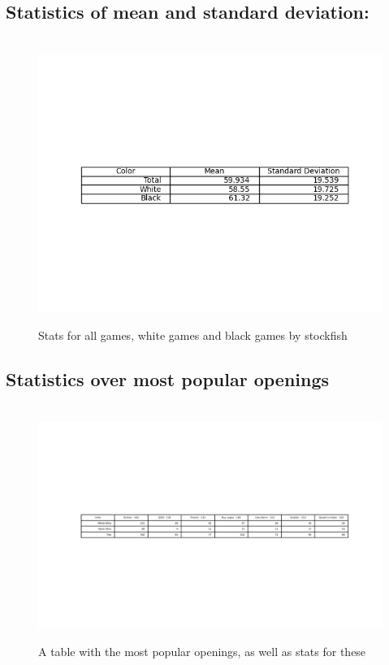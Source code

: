 \documentclass{article}%
\begin{document}
%
\subsection{Statistics of mean and standard deviation:}%
\label{subsec:Statisticsofmeanandstandarddeviation}%


\begin{figure}[h!]%
\ \hspace*{-3cm}%
\centering%
\includegraphics[width=1.4\textwidth]{table.png}%
\caption{Stats for all games, white games and black games by stockfish}%
\end{figure}

%
\subsection{Statistics over most popular openings}%
\label{subsec:Statisticsovermostpopularopenings}%


\begin{figure}[h!]%
\ \hspace*{-5cm}%
\centering%
\includegraphics[width=1.8\textwidth]{NormalOpenings.png}%
\caption{A table with the most popular openings, as well as stats for these}%
\end{figure}
\end{document}
